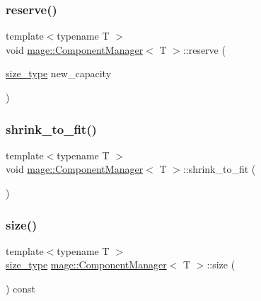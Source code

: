 \subsubsection{\texorpdfstring{reserve()}{reserve()}}
{\footnotesize\ttfamily template$<$typename T $>$ \\
void \mbox{\hyperlink{classmage_1_1_component_manager}{mage\+::\+Component\+Manager}}$<$ T $>$\+::reserve (\begin{DoxyParamCaption}\item[{\mbox{\hyperlink{classmage_1_1_component_manager_a6bd219525db9ec9f3adb9259e52674da}{size\+\_\+type}}}]{new\+\_\+capacity }\end{DoxyParamCaption})}

\mbox{\label{classmage_1_1_component_manager_a5cad9b6765b1088761b008cc964f1e47}} 
\subsubsection{\texorpdfstring{shrink\+\_\+to\+\_\+fit()}{shrink\_to\_fit()}}
{\footnotesize\ttfamily template$<$typename T $>$ \\
void \mbox{\hyperlink{classmage_1_1_component_manager}{mage\+::\+Component\+Manager}}$<$ T $>$\+::shrink\+\_\+to\+\_\+fit (\begin{DoxyParamCaption}{ }\end{DoxyParamCaption})}

\mbox{\label{classmage_1_1_component_manager_a6270cd0248b48e7de34421b34fc774c9}} 
\subsubsection{\texorpdfstring{size()}{size()}}
{\footnotesize\ttfamily template$<$typename T $>$ \\
\mbox{\hyperlink{classmage_1_1_component_manager_a6bd219525db9ec9f3adb9259e52674da}{size\+\_\+type}} \mbox{\hyperlink{classmage_1_1_component_manager}{mage\+::\+Component\+Manager}}$<$ T $>$\+::size (\begin{DoxyParamCaption}{ }\end{DoxyParamCaption}) const\hspace{0.3cm}{\ttfamily [noexcept]}}

